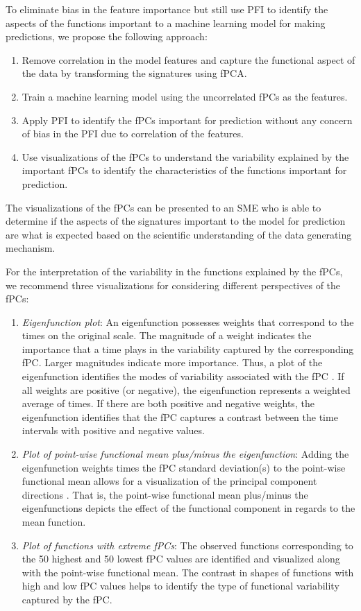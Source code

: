 \documentclass[letterpaper]{article}
\begin{document}
To eliminate bias in the feature importance but still use PFI to identify the aspects of the functions important to a machine learning model for making predictions, we propose the following approach:

\begin{enumerate}
\item Remove correlation in the model features and capture the functional aspect of the data by transforming the signatures using fPCA.
\item Train a machine learning model using the uncorrelated fPCs as the features.
\item Apply PFI to identify the fPCs important for prediction without any concern of bias in the PFI due to correlation of the features.
\item Use visualizations of the fPCs to understand the variability explained by the important fPCs to identify the characteristics of the functions important for prediction.
\end{enumerate}

The visualizations of the fPCs can be presented to an SME who is able to determine if the aspects of the signatures important to the model for prediction are what is expected based on the scientific understanding of the data generating mechanism.

For the interpretation of the variability in the functions explained by the fPCs, we recommend three visualizations for considering different perspectives of the fPCs:

\begin{enumerate}
\item \textit{Eigenfunction plot}: An eigenfunction possesses weights that correspond to the times on the original scale. The magnitude of a weight indicates the importance that a time plays in the variability captured by the corresponding fPC. Larger magnitudes indicate more importance. Thus, a plot of the eigenfunction identifies the modes of variability associated with the fPC \cite{ramsay:2005}. If all weights are positive (or negative), the eigenfunction represents a weighted average of times. If there are both positive and negative weights, the eigenfunction identifies that the fPC captures a contrast between the time intervals with positive and negative values.
\item \textit{Plot of point-wise functional mean plus/minus the eigenfunction}: Adding the eigenfunction weights times the fPC standard deviation(s) to the point-wise functional mean allows for a visualization of the principal component directions \cite{ramsay:2005}. That is, the point-wise functional mean plus/minus the eigenfunctions depicts the effect of the functional component in regards to the mean function.
\item \textit{Plot of functions with extreme fPCs}: The observed functions corresponding to the 50 highest and 50 lowest fPC values are identified and visualized along with the point-wise functional mean. The contrast in shapes of functions with high and low fPC values helps to identify the type of functional variability captured by the fPC.
\end{enumerate}
\end{document}
